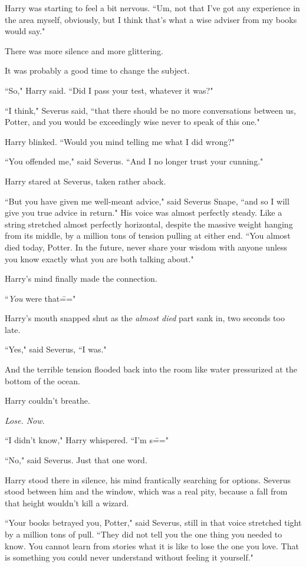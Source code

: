 Harry was starting to feel a bit nervous. ``Um, not that I've got any experience in the area myself, obviously, but I think that's what a wise adviser from my books would say."

There was more silence and more glittering.

It was probably a good time to change the subject.

``So," Harry said. ``Did I pass your test, whatever it was?"

``I think," Severus said, ``that there should be no more conversations between us, Potter, and you would be exceedingly wise never to speak of this one."

Harry blinked. ``Would you mind telling me what I did wrong?"

``You offended me," said Severus. ``And I no longer trust your cunning."

Harry stared at Severus, taken rather aback.

``But you have given me well-meant advice," said Severus Snape, ``and so I will give you true advice in return." His voice was almost perfectly steady. Like a string stretched almost perfectly horizontal, despite the massive weight hanging from its middle, by a million tons of tension pulling at either end. ``You almost died today, Potter. In the future, never share your wisdom with anyone unless you know exactly what you are both talking about."

Harry's mind finally made the connection.

``\emph{You} were that\==="

Harry's mouth snapped shut as the \emph{almost died} part sank in, two seconds too late.

``Yes," said Severus, ``I was."

And the terrible tension flooded back into the room like water pressurized at the bottom of the ocean.

Harry couldn't breathe.

\emph{Lose. Now.}

``I didn't know," Harry whispered. ``I'm s\==="

``No," said Severus. Just that one word.

Harry stood there in silence, his mind frantically searching for options. Severus stood between him and the window, which was a real pity, because a fall from that height wouldn't kill a wizard.

``Your books betrayed you, Potter," said Severus, still in that voice stretched tight by a million tons of pull. ``They did not tell you the one thing you needed to know. You cannot learn from stories what it is like to lose the one you love. That is something you could never understand without feeling it yourself."

